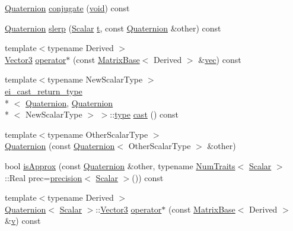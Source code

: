 \begin{DoxyCompactItemize}
\item 
\hyperlink{class_quaternion}{Quaternion} \hyperlink{class_quaternion_a9b721d2b930f481554b3b9e23a54096a}{conjugate} (\hyperlink{group___u_a_v_objects_plugin_ga444cf2ff3f0ecbe028adce838d373f5c}{void}) const 
\item 
\hyperlink{class_quaternion}{Quaternion} \hyperlink{class_quaternion_a96e6495f85941b9f2bf883b6f38c47ea}{slerp} (\hyperlink{class_rotation_base_ae9cbe0a3a87dfe2fa70958d9fe948a09}{Scalar} \hyperlink{glext_8h_a00140d6f5c548b26daf170bf16e86a6d}{t}, const \hyperlink{class_quaternion}{Quaternion} \&other) const 
\item 
{\footnotesize template$<$typename Derived $>$ }\\\hyperlink{class_quaternion_a585d82ad2af10253cfcbd08241bc6ca2}{Vector3} \hyperlink{class_quaternion_a11d9aaf3b15449b00aa6339b19c996db}{operator$\ast$} (const \hyperlink{class_matrix_base}{Matrix\-Base}$<$ Derived $>$ \&\hyperlink{class_quaternion_a10d14d80ff427795e62e7e8b049f1279}{vec}) const 
\item 
{\footnotesize template$<$typename New\-Scalar\-Type $>$ }\\\hyperlink{structei__cast__return__type}{ei\-\_\-cast\-\_\-return\-\_\-type}\\*
$<$ \hyperlink{class_quaternion}{Quaternion}, \hyperlink{class_quaternion}{Quaternion}\\*
$<$ New\-Scalar\-Type $>$ $>$\-::\hyperlink{glext_8h_a7d05960f4f1c1b11f3177dc963a45d86}{type} \hyperlink{class_quaternion_a2edbf32b00fca109eee807139f122b59}{cast} () const 
\item 
{\footnotesize template$<$typename Other\-Scalar\-Type $>$ }\\\hyperlink{class_quaternion_a970981fb66a11b6929b1e9a99c3b0885}{Quaternion} (const \hyperlink{class_quaternion}{Quaternion}$<$ Other\-Scalar\-Type $>$ \&other)
\item 
bool \hyperlink{class_quaternion_a9d4080066641252e12e2d04782ed0bac}{is\-Approx} (const \hyperlink{class_quaternion}{Quaternion} \&other, typename \hyperlink{struct_num_traits}{Num\-Traits}$<$ \hyperlink{class_rotation_base_ae9cbe0a3a87dfe2fa70958d9fe948a09}{Scalar} $>$\-::Real prec=\hyperlink{_math_functions_8h_a3dc1c65cf9dc9b5a7ee66472d0ae83e1}{precision}$<$ \hyperlink{class_rotation_base_ae9cbe0a3a87dfe2fa70958d9fe948a09}{Scalar} $>$()) const 
\item 
{\footnotesize template$<$typename Derived $>$ }\\\hyperlink{class_quaternion}{Quaternion}$<$ \hyperlink{class_rotation_base_ae9cbe0a3a87dfe2fa70958d9fe948a09}{Scalar} $>$\-::\hyperlink{class_quaternion_a585d82ad2af10253cfcbd08241bc6ca2}{Vector3} \hyperlink{class_quaternion_ac3d6d6cb3e28e72c0a741f793d465888}{operator$\ast$} (const \hyperlink{class_matrix_base}{Matrix\-Base}$<$ Derived $>$ \&\hyperlink{glext_8h_a14cfbe2fc2234f5504618905b69d1e06}{v}) const 

\end{DoxyCompactItemize}

